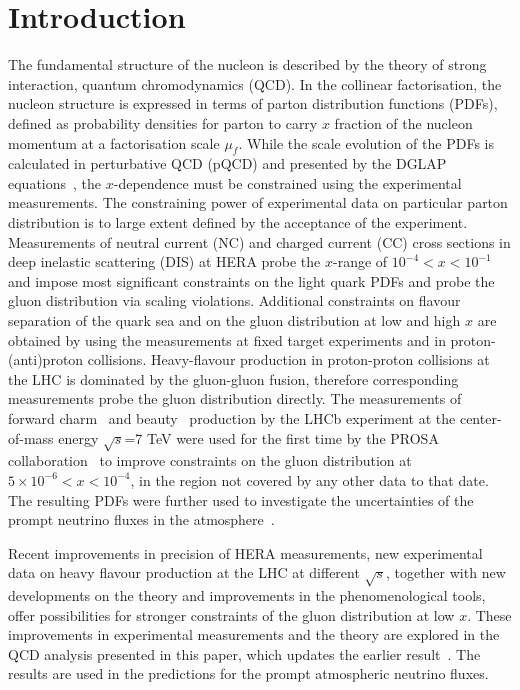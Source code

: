 \documentclass[12pt]{article}
\begin{document}
\section{Introduction}
\label{sect:intro}

The fundamental structure of the nucleon is described by the theory of strong interaction, quantum chromodynamics (QCD).
In the collinear factorisation, the nucleon structure is expressed in terms of parton distribution functions (PDFs), defined 
as probability densities for parton to carry $x$ fraction of the nucleon momentum at a factorisation scale $\mu_f$. While the 
scale evolution of the PDFs is calculated in perturbative QCD (pQCD) and presented by the DGLAP equations~\cite{Dokshitzer:1977sg,Gribov:1972ri,Altarelli:1977zs,Curci:1980uw,Furmanski:1980cm,Moch:2004pa,Vogt:2004mw}, the 
$x$-dependence must be constrained using the experimental measurements. The constraining power of experimental data 
on particular parton distribution is to large extent defined by the acceptance of the experiment. Measurements of 
neutral current (NC) and charged current (CC) cross sections in deep inelastic scattering (DIS) at HERA probe the $x$-range of $10^{-4}<x<10^{-1}$ and impose most significant constraints on the light quark PDFs and probe the gluon distribution via scaling violations. Additional constraints on flavour separation of the quark sea and on the gluon distribution at low and high $x$ are obtained by using the measurements at fixed target experiments and in proton-(anti)proton collisions. Heavy-flavour production in proton-proton collisions at the LHC is dominated by the gluon-gluon fusion, therefore corresponding measurements probe the gluon distribution directly. The measurements of forward charm~\cite{Aaij:2013mga} and beauty~\cite{Aaij:2013noa} production by the LHCb experiment at the center-of-mass energy $\sqrt{s}$=7 TeV were used for the first time by the PROSA collaboration~\cite{Zenaiev:2015rfa} to improve constraints on the gluon distribution at $5 \times 10^{-6}< x < 10^{-4}$, in the region not covered by any other data to that date. The resulting PDFs were further used to investigate the uncertainties of the prompt neutrino fluxes in the atmosphere~\cite{Garzelli:2016xmx}.       

Recent improvements in precision of HERA measurements, new experimental data on heavy flavour production at the LHC at 
different $\sqrt{s}$, together with new developments on the theory and improvements in the phenomenological tools, offer 
possibilities for stronger constraints of the gluon distribution at low $x$. These improvements in experimental measurements 
and the theory are explored in the QCD analysis presented in this paper, which updates the earlier result~\cite{Zenaiev:2015rfa}. The results are used in the predictions for the prompt atmospheric neutrino fluxes. 
\end{document}
